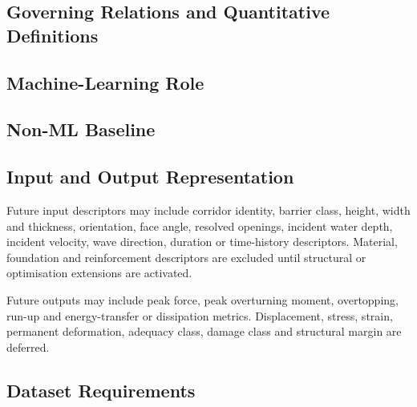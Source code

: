 \subsection{Governing Relations and Quantitative Definitions}
\label{sec:res-ml-rep-governing-relations}

%

\subsection{Machine-Learning Role}
\label{sec:res-ml-rep-machine-learning-role}


\subsection{Non-ML Baseline}
\label{sec:res-ml-rep-non-ml-baseline}


\subsection{Input and Output Representation}
\label{sec:res-ml-rep-input-output-representation}

Future input descriptors may include corridor identity, barrier class,
height, width and thickness, orientation, face angle, resolved openings,
incident water depth, incident velocity, wave direction, duration or
time-history descriptors. Material, foundation and reinforcement
descriptors are excluded until structural or optimisation extensions
are activated.

Future outputs may include peak force, peak overturning moment,
overtopping, run-up and energy-transfer or dissipation metrics.
Displacement, stress, strain, permanent deformation, adequacy class,
damage class and structural margin are deferred.

\subsection{Dataset Requirements}
\label{sec:res-ml-rep-dataset-requirements}

